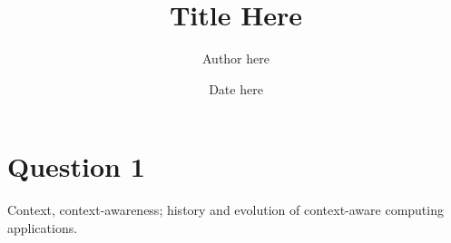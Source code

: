 \documentclass{article}
\title{Title Here}
\author{Author here}
\date{Date here}
\begin{document}
\maketitle
\thispagestyle{empty}
\newpage
\section*{Question 1}
Context, context-awareness; history and evolution of context-aware computing
applications.
\end{document}
